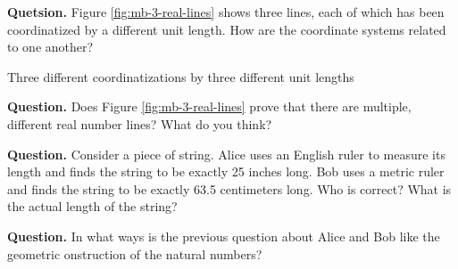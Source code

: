 \small\textbf{Quetsion.} Figure \ref{fig:mb-3-real-lines} shows three lines, each of which has been coordinatized by a different unit length. How are the coordinate systems related to one another?

\begin{marginfigure}
  
  \caption{\label{fig:mb-3-real-lines} Three different coordinatizations by three different unit lengths}
\end{marginfigure}

\textbf{Question.} Does Figure \ref{fig:mb-3-real-lines} prove that there are multiple, different real number lines? What do you think?

\textbf{Question.} Consider a piece of string. Alice uses an English ruler to measure its length and finds the string to be exactly 25 inches long. Bob uses a metric ruler and finds the string to be exactly 63.5 centimeters long. Who is correct? What is the actual length of the string?

\textbf{Question.} In what ways is the previous question about Alice and Bob like the geometric onstruction of the natural numbers?
\normalsize


%
%
%
%
%

